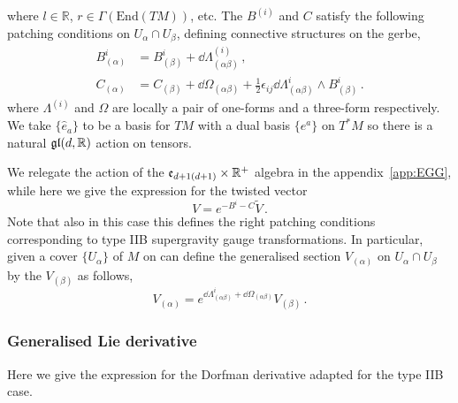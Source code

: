 \documentclass[debug]{phd}
\begin{document}
						where $l\in\mathbb{R}$, $r\in\Gamma(\mathrm{End}(TM))$, etc. 
						The $B^{(i)}$ and $C$ satisfy the following patching conditions on $U_\alpha \cap U_\beta$, defining connective structures on the gerbe,
								\begin{equation}
									\begin{split}
										B^{i}_{(\alpha)} 	& = B^{i}_{(\beta)} + \dd \Lambda^{(i)}_{(\alpha \beta)} \, , \\
										C_{(\alpha)}	& = C_{(\beta)} + \dd \Omega_{(\alpha\beta)} + \frac{1}{2} \epsilon_{ij} \dd \Lambda^i_{(\alpha \beta)} \wedge B^i_{(\beta)} \, .
									\end{split}
								\end{equation}
						where $\Lambda^{(i)}$ and $\Omega$ are locally a pair of one-forms and a three-form respectively.
						We take $\{\hat{e}_{a}\}$ to be a basis for $TM$ with a dual basis $\{e^{a}\}$ on $T^{*}M$ so there is a natural $\mathfrak{gl}(d, \mathbb{R})$ action on tensors. 
						
						We relegate the action of the $\mathfrak{e}_{d+1(d+1)} \times \mathbb{R}^+	$ algebra in the appendix~\ref{app:EGG}, while here we give the expression for the twisted vector
								\begin{equation}\label{twistVecIIB}
									V = e^{-B^i - C} \tilde{V} \, .
								\end{equation}
						Note that also in this case this defines the right patching conditions corresponding to type IIB supergravity gauge transformations.
						In particular, given a cover $\{U_{\alpha}\}$ of $M$ on can define the generalised section $V_{(\alpha)}$ on $U_\alpha \cap U_\beta$ by the $V_{(\beta)}$ as follows,
								\begin{equation}
									V_{(\alpha)} = e^{\dd \Lambda^i_{(\alpha\beta)} + \dd \Omega_{(\alpha\beta)}} V_{(\beta)}\, .
								\end{equation}
				\subsubsection{Generalised Lie derivative}
						Here we give the expression for the Dorfman derivative adapted for the type IIB case.
						
\end{document}
